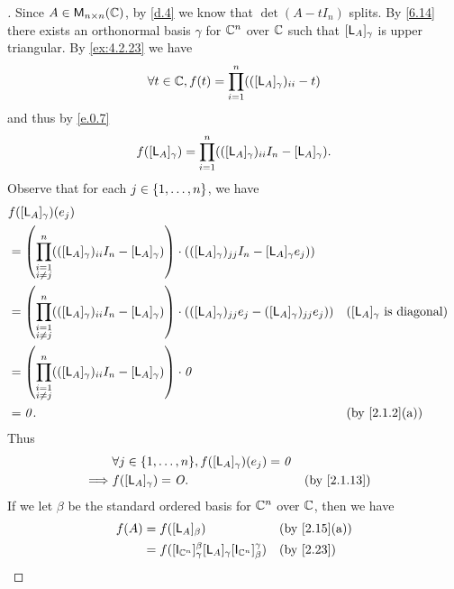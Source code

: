 \begin{proof}[]
  Since \(A \in \ms[n][n][\C]\), by \cref{d.4} we know that \(\det(A - t I_n)\) splits.
  By \cref{6.14} there exists an orthonormal basis \(\gamma\) for \(\mathbb{C}^n\) over \(\mathbb{C}\) such that \([\mathsf{L}_A]_{\gamma}\) is upper triangular.
  By \cref{ex:4.2.23} we have
  \[
    \forall t \in \mathbb{C}, f(t) = \prod_{i = 1}^n (([\mathsf{L}_A]_{\gamma})_{i i} - t)
  \]
  and thus by \cref{e.0.7}
  \[
    f([\mathsf{L}_A]_{\gamma}) = \prod_{i = 1}^n (([\mathsf{L}_A]_{\gamma})_{i i} I_n - [\mathsf{L}_A]_{\gamma}).
  \]
  Observe that for each \(j \in \left\lbrace1, \dots, n\right\rbrace\), we have
  \begin{align*}
     & f([\L_A]_{\gamma})(e_j)                         \\
     & = \pa{\prod_{\substack{i = 1                    \\ i \neq j}}^n (([\L_A]_{\gamma})_{i i} I_n - [\L_A]_{\gamma})} \cdot (([\L_A]_{\gamma})_{j j} I_n - [\L_A]_{\gamma} e_j))         \\
     & = \pa{\prod_{\substack{i = 1                    \\ i \neq j}}^n (([\L_A]_{\gamma})_{i i} I_n - [\L_A]_{\gamma})} \cdot (([\L_A]_{\gamma})_{j j} e_j - ([\L_A]_{\gamma})_{j j} e_j)) && \text{(\([\L_A]_{\gamma}\) is diagonal)} \\
     & = \pa{\prod_{\substack{i = 1                    \\ i \neq j}}^n (([\L_A]_{\gamma})_{i i} I_n - [\L_A]_{\gamma})} \cdot \zv \\
     & = \zv.                       &  & \by{2.1.2}[a]
  \end{align*}
  Thus
  \begin{align*}
             & \forall j \in \set{1, \dots, n}, f([\L_A]_{\gamma})(e_j) = \zv                  \\
    \implies & f([\L_A]_{\gamma}) = \zm.                                      &  & \by{2.1.13}
  \end{align*}
  If we let \(\beta\) be the standard ordered basis for \(\mathbb{C}^n\) over \(\mathbb{C}\), then we have
  \begin{align*}
    f(A) & = f([\L_A]_{\beta})                                                                                                                                                               &  & \by{2.15}[a]                  \\
         & = f([\IT[\C^n]]_{\gamma}^{\beta} [\L_A]_{\gamma} [\IT[\C^n]]_{\beta}^{\gamma})                                                                                                    &  & \by{2.23}                     \\

\end{align*}
\end{proof}
